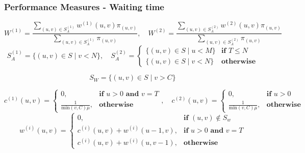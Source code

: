 \begin{frame}
    \frametitle{Performance Measures - Waiting time}

    \scriptsize
    \begin{equation*}
        W^{(1)} = \frac{\sum_{(u,v) \in S_A^{(1)}} w^{(1)}(u,v) 
        \pi_{(u,v)}}{\sum_{(u,v) \in S_A^{(1)}} \pi_{(u,v)}},
        \quad
        W^{(2)} = \frac{\sum_{(u,v) \in S_A^{(2)}} w^{(2)}(u,v) \pi_{(u,v)}}
        {\sum_{(u,v) \in S_A^{(2)}} \pi_{(u,v)}}
    \end{equation*}
    \vspace{1cm}
    \tiny
    \pause
    \begin{equation*}
        S_A^{(1)} = \{(u, v) \in S \; | \; v < N \}, 
        \quad
        S_A^{(2)}=
        \begin{cases}
            \{(u, v) \in S \; | \; u < M \} & \textbf{if } T \leq N\\
            \{(u, v) \in S \; | \; v < N \} & \textbf{otherwise}
        \end{cases}
    \end{equation*}
    
    \pause
    \begin{equation*}
        S_W = \{(u, v) \in S \; | \; v > C \}    
    \end{equation*}

    \pause
    \begin{equation*}
        c^{(1)}(u,v) = 
        \begin{cases}
            0, & \textbf{if } u > 0 \textbf{ and } v = T \\
            \frac{1}{\text{min}(v,C)\mu}, & \textbf{otherwise}
        \end{cases}, 
        \quad
        c^{(2)}(u,v) = 
        \begin{cases}
            0, & \textbf{if } u > 0 \\
            \frac{1}{\text{min}(v,C)\mu}, & \textbf{otherwise}
        \end{cases}
    \end{equation*}
    \pause
    \begin{equation*}
        w^{(i)}(u,v) = 
        \begin{cases} 
            0, & \textbf{if } (u,v) \notin S_w \\
            c^{(i)}(u,v) + w^{(i)}(u-1, v), & \textbf{if } u > 0 \textbf{ and } v = T \\
            c^{(i)}(u,v) + w^{(i)}(u, v-1), & \textbf{otherwise}
        \end{cases}
    \end{equation*}

\end{frame}


